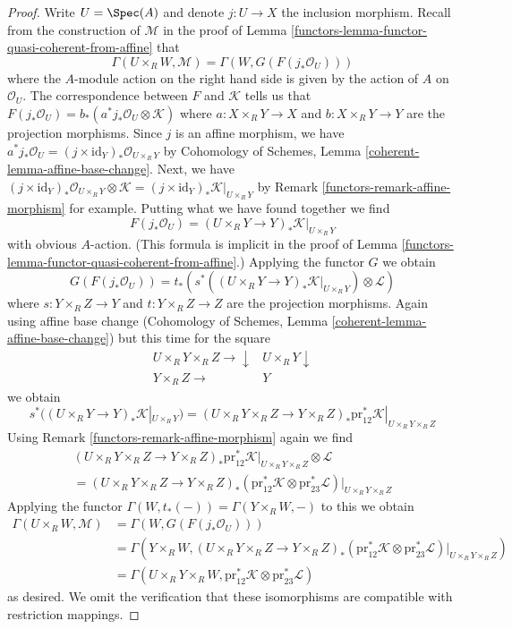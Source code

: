 \begin{proof}
\medskip\noindent
Write $U = \Spec(A)$ and denote $j : U \to X$ the inclusion morphism.
Recall from the construction of $\mathcal{M}$ in the proof of
Lemma \ref{functors-lemma-functor-quasi-coherent-from-affine} that
$$
\Gamma(U \times_R W, \mathcal{M}) =
\Gamma(W, G(F(j_*\mathcal{O}_U)))
$$
where the $A$-module action on the right hand side is given by
the action of $A$ on $\mathcal{O}_U$. The correspondence between
$F$ and $\mathcal{K}$ tells us that
$F(j_*\mathcal{O}_U) = b_*(a^*j_*\mathcal{O}_U \otimes \mathcal{K})$
where $a : X \times_R Y \to X$ and $b : X \times_R Y \to Y$ are
the projection morphisms. Since $j$ is an affine morphism, we have
$a^*j_*\mathcal{O}_U = (j \times \text{id}_Y)_*\mathcal{O}_{U \times_R Y}$
by Cohomology of Schemes, Lemma
\ref{coherent-lemma-affine-base-change}.
Next, we have
$(j \times \text{id}_Y)_*\mathcal{O}_{U \times_R Y} \otimes \mathcal{K} =
(j \times \text{id}_Y)_*\mathcal{K}|_{U \times_R Y}$
by Remark \ref{functors-remark-affine-morphism} for example.
Putting what we have found together we find
$$
F(j_*\mathcal{O}_U) =
(U \times_R Y \to Y)_*\mathcal{K}|_{U \times_R Y}
$$
with obvious $A$-action. (This formula is implicit in the proof
of Lemma \ref{functors-lemma-functor-quasi-coherent-from-affine}.)
Applying the functor $G$ we obtain
$$
G(F(j_*\mathcal{O}_U)) =
t_*(s^*((U \times_R Y \to Y)_*\mathcal{K}|_{U \times_R Y})
\otimes \mathcal{L})
$$
where $s : Y \times_R Z \to Y$ and $t : Y \times_R Z \to Z$ are
the projection morphisms. Again using affine base change
(Cohomology of Schemes, Lemma \ref{coherent-lemma-affine-base-change})
but this time for the square
$$
\begin{array}{cc}U \times_R Y \times_R Z \longrightarrow\downarrow & U \times_R Y \downarrow \\ Y \times_R Z \longrightarrow & Y\end{array}
$$
we obtain
$$
s^*((U \times_R Y \to Y)_*\mathcal{K}|_{U \times_R Y}) =
(U \times_R Y \times_R Z \to Y \times_R Z)_*
\text{pr}_{12}^*\mathcal{K}|_{U \times_R Y \times_R Z}
$$
Using Remark \ref{functors-remark-affine-morphism} again we find
\begin{align*}
(U \times_R Y \times_R Z \to Y \times_R Z)_*
\text{pr}_{12}^*\mathcal{K}|_{U \times_R Y \times_R Z}
\otimes \mathcal{L} \\
=
(U \times_R Y \times_R Z \to Y \times_R Z)_*
\left(\text{pr}_{12}^*\mathcal{K} \otimes
\text{pr}_{23}^*\mathcal{L}\right)|_{U \times_R Y \times_R Z}
\end{align*}
Applying the functor $\Gamma(W, t_*(-)) = \Gamma(Y \times_R W, -)$
to this we obtain
\begin{align*}
\Gamma(U \times_R W, \mathcal{M})
& =
\Gamma(W, G(F(j_*\mathcal{O}_U))) \\
& =
\Gamma(Y \times_R W, (U \times_R Y \times_R Z \to Y \times_R Z)_*
(\text{pr}_{12}^*\mathcal{K} \otimes
\text{pr}_{23}^*\mathcal{L})|_{U \times_R Y \times_R Z}) \\
& =
\Gamma(U \times_R Y \times_R W,
\text{pr}_{12}^*\mathcal{K} \otimes \text{pr}_{23}^*\mathcal{L})
\end{align*}
as desired. We omit the verification that these isomorphisms are
compatible with restriction mappings.
\end{proof}


